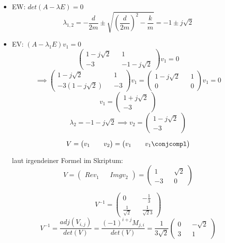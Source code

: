 \documentclass[a4paper]{article}
\begin{document}
\begin{itemize}
    \item EW: $det(A-\lambda E)=0$
        \[ \lambda_{1,2}=-\frac{d}{2m}\pm \sqrt{(\frac{d}{2m})^{2} -\frac{k}{m}}=-1\pm j\sqrt{2}  \] 
    \item EV: $(A-\lambda_{1}E)v_{1}=0$
         \[ \begin{pmatrix}
        1-j\sqrt{2}  && 1\\
         -3 && -1-j\sqrt{2} 
         \end{pmatrix}  v_{1}=0 \]
        \[ \implies \begin{pmatrix}
        1-j\sqrt{2}  && 1\\
        -3(1-j\sqrt{2} ) && -3
        \end{pmatrix}  
        v_{1}
        =\begin{pmatrix}
        1-j\sqrt{2}  && 1\\
        0 && 0
        \end{pmatrix} 
        v_{1}=0
    \]
      \[ v_{1}=\begin{pmatrix} 1+j\sqrt{2} \\ -3\end{pmatrix} \]
      \[ \lambda_{2}=-1-j\sqrt{2} \implies v_{2}=\begin{pmatrix} 1-j\sqrt{2} \\ -3\end{pmatrix}  \]
      
      \[ V=\begin{pmatrix} v_{1}&& v_{2}\end{pmatrix}=\begin{pmatrix} v_{1}&& v_{1}\conjcompl\end{pmatrix} \]

      laut irgendeiner Formel im Skriptum:
      \[ V=\begin{pmatrix} Re{v_{1}}&& Img{v_{2}}\end{pmatrix}
  = \begin{pmatrix}
  1 && \sqrt{2} \\
  -3 && 0
  \end{pmatrix} \]

  \[ V^{-1}=\begin{pmatrix}
  0 && -\frac{1}{3}\\
  \frac{1}{\sqrt{2} } && \frac{1}{\sqrt{2}3 }
  \end{pmatrix}  \]
  \[ V^{-1}=\frac{adj(V_{i,j})}{det(V)}=\frac{(-1)^{i+j} M_{j,i}}{det(V)}=\frac{1}{3\sqrt{2} }\begin{pmatrix}
  0 && -\sqrt{2} \\
  3 && 1
  \end{pmatrix}  \]
  

\end{itemize}
\end{document}
